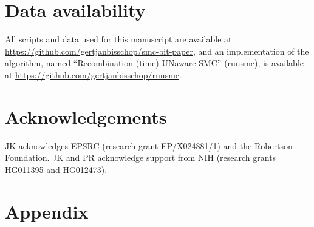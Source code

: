 \documentclass{article}
\newcommand{\tsinfer}[0]{\texttt{tsinfer}}
\newcommand{\argneedle}[0]{\texttt{ARG-Needle}}
\newcommand{\relate}[0]{\texttt{Relate}}
\begin{document}




\section*{Data availability}

All scripts and data used for this manuscript are available at
\url{https://github.com/gertjanbisschop/smc-bit-paper},
and an implementation of the algorithm,
named ``Recombination (time) UNaware SMC'' (runsmc),
is available at
\url{https://github.com/gertjanbisschop/runsmc}.

\section*{Acknowledgements}
JK acknowledges EPSRC (research grant EP/X024881/1)
and the Robertson Foundation.
JK and PR acknowledge support from
NIH (research grants HG011395 and HG012473).

\FloatBarrier



\setcounter{secnumdepth}{2} %

\section*{Appendix}
\appendix
\end{document}
